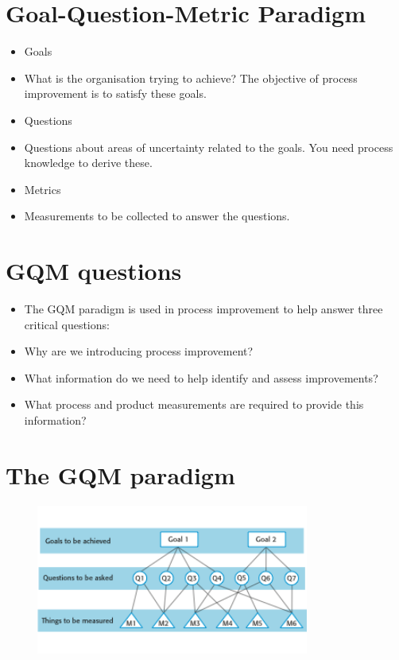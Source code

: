 \section{Goal-Question-Metric Paradigm}
\begin{itemize}

\item Goals

   \item What is the organisation trying to achieve? The objective of process improvement is to satisfy these goals.

\item Questions

   \item Questions about areas of uncertainty related to the goals. You need process knowledge to derive these.

\item Metrics

   \item Measurements to be collected to answer the questions.



\end{itemize}

\section{GQM questions}
\begin{itemize}

\item The GQM paradigm is used in process improvement to help answer three critical questions:

   \item Why are we introducing process improvement?

   \item What information do we need to help identify and assess improvements?
   \item What process and product measurements are required to provide this information?



\end{itemize}

\section{The GQM paradigm}
\begin{figure}[h!]
    \centering
    \includegraphics[width = 0.8\textwidth]{./figures/L9_3.png}
    \caption{}
    \label{fig:L9_3}
\end{figure}


